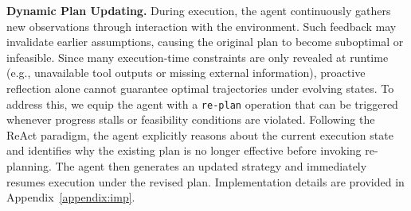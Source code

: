 \noindent\textbf{Dynamic Plan Updating.} 
During execution, the agent continuously gathers new observations through interaction with the environment. Such feedback may invalidate earlier assumptions, causing the original plan to become suboptimal or infeasible. Since many execution-time constraints are only revealed at runtime (e.g., unavailable tool outputs or missing external information), proactive reflection alone cannot guarantee optimal trajectories under evolving states.
To address this, we equip the agent with a \texttt{re-plan} operation that can be triggered whenever progress stalls or feasibility conditions are violated. Following the ReAct paradigm, the agent explicitly reasons about the current execution state and identifies why the existing plan is no longer effective before invoking re-planning. The agent then generates an updated strategy and immediately resumes execution under the revised plan. Implementation details are provided in Appendix~\ref{appendix:imp}.


